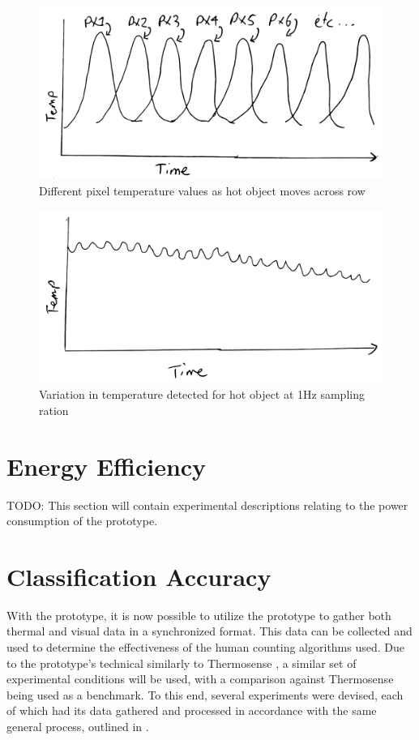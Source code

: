 \documentclass[../thesis/thesis.tex]{subfiles}
\begin{document}
\begin{figure}
\centering
\includegraphics[width=\textwidth]{../diagrams/temp/motion.pdf}
\caption{Different \mlx pixel temperature values as hot object moves across row}
\label{fig:hotmotion}
\end{figure}

\begin{figure}
\centering
\includegraphics[width=\textwidth]{../diagrams/temp/cooldown.pdf}
\caption{Variation in temperature detected for hot object at 1Hz sampling ration}
\label{fig:cooldown}
\end{figure}

\section{Energy Efficiency}

TODO: This section will contain experimental descriptions relating to the power consumption of the prototype.

\section{Classification Accuracy}

With the prototype, it is now possible to utilize the prototype to gather both thermal and visual data in a synchronized format. This data can be collected and used to determine the effectiveness of the human counting algorithms used. Due to the prototype's technical similarly to Thermosense \cite{beltran2013thermosense}, a similar set of experimental conditions will be used, with a comparison against Thermosense being used as a benchmark. To this end, several experiments were devised, each of which had its data gathered and processed in accordance with the same general process, outlined in .
\end{document}
